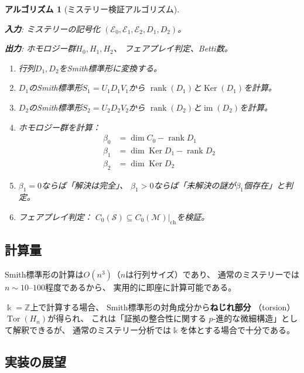 \documentclass[12pt,twocolumn]{ltjsarticle}
\newtheorem{algorithm_def}[theorem]{アルゴリズム}
\newcommand{\Z}{\mathbb{Z}}
\newcommand{\Tor}{\operatorname{Tor}}
\newcommand{\im}{\operatorname{im}}
\newcommand{\Ker}{\operatorname{Ker}}
\renewcommand{\rank}{\operatorname{rank}}
\newcommand{\Ev}{\mathcal{E}}
\newcommand{\Mys}{\mathcal{M}}
\newcommand{\Sol}{\mathcal{S}}
\newcommand{\kk}{\Bbbk}
\begin{document}
\begin{algorithm_def}[ミステリー検証アルゴリズム]
\label{alg:verify}
\phantom{.}

\noindent\textbf{入力}: ミステリーの記号化
$(\Ev_0, \Ev_1, \Ev_2, D_1, D_2)$。

\noindent\textbf{出力}: ホモロジー群$H_0, H_1, H_2$、
フェアプレイ判定、Betti数。

\begin{enumerate}
\item 行列$D_1, D_2$をSmith標準形に変換する。

\item $D_1$のSmith標準形$S_1 = U_1 D_1 V_1$から
$\rank(D_1)$と$\Ker(D_1)$を計算。

\item $D_2$のSmith標準形$S_2 = U_2 D_2 V_2$から
$\rank(D_2)$と$\im(D_2)$を計算。

\item ホモロジー群を計算：
\begin{align}
\beta_0 &= \dim C_0 - \rank D_1 \\
\beta_1 &= \dim \Ker D_1 - \rank D_2 \\
\beta_2 &= \dim \Ker D_2
\end{align}

\item $\beta_1 = 0$ならば「解決は完全」、
$\beta_1 > 0$ならば「未解決の謎が$\beta_1$個存在」と判定。

\item フェアプレイ判定：
$C_0(\Sol) \subseteq C_0(\Mys)|_{\text{ch}}$を検証。
\end{enumerate}
\end{algorithm_def}

\subsection{計算量}

Smith標準形の計算は$O(n^3)$（$n$は行列サイズ）であり、
通常のミステリーでは$n \sim 10$--$100$程度であるから、
実用的に即座に計算可能である。

$\kk = \Z$上で計算する場合、
Smith標準形の対角成分から\textbf{ねじれ部分}
（torsion）$\Tor(H_n)$が得られ、
これは「証拠の整合性に関する
$p$-進的な微細構造」として解釈できるが、
通常のミステリー分析では$\kk$を体とする場合で十分である。

\subsection{実装の展望}
\end{document}
